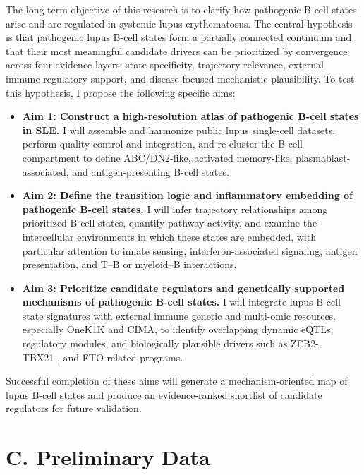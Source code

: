\documentclass[12pt, a4paper]{article}
\begin{document}
The long-term objective of this research is to clarify how pathogenic B-cell states arise and are regulated in systemic lupus erythematosus. The central hypothesis is that pathogenic lupus B-cell states form a partially connected continuum and that their most meaningful candidate drivers can be prioritized by convergence across four evidence layers: state specificity, trajectory relevance, external immune regulatory support, and disease-focused mechanistic plausibility. To test this hypothesis, I propose the following specific aims:

\begin{itemize}[leftmargin=*]
    \item \textbf{Aim 1: Construct a high-resolution atlas of pathogenic B-cell states in SLE.} I will assemble and harmonize public lupus single-cell datasets, perform quality control and integration, and re-cluster the B-cell compartment to define ABC/DN2-like, activated memory-like, plasmablast-associated, and antigen-presenting B-cell states.
    
    \item \textbf{Aim 2: Define the transition logic and inflammatory embedding of pathogenic B-cell states.} I will infer trajectory relationships among prioritized B-cell states, quantify pathway activity, and examine the intercellular environments in which these states are embedded, with particular attention to innate sensing, interferon-associated signaling, antigen presentation, and T--B or myeloid--B interactions.
    
    \item \textbf{Aim 3: Prioritize candidate regulators and genetically supported mechanisms of pathogenic B-cell states.} I will integrate lupus B-cell state signatures with external immune genetic and multi-omic resources, especially OneK1K and CIMA, to identify overlapping dynamic eQTLs, regulatory modules, and biologically plausible drivers such as ZEB2-, TBX21-, and FTO-related programs.
\end{itemize}

Successful completion of these aims will generate a mechanism-oriented map of lupus B-cell states and produce an evidence-ranked shortlist of candidate regulators for future validation.

\section*{C. Preliminary Data}
\end{document}
